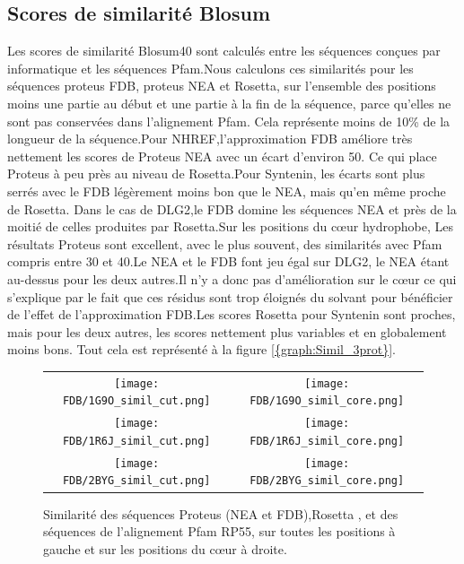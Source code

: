 \subsection{Scores de similarité Blosum}
Les scores de similarité Blosum40 sont calculés entre les séquences conçues par informatique et les séquences Pfam.Nous calculons ces similarités pour les séquences proteus FDB, proteus NEA et Rosetta, sur l'ensemble des positions moins une partie au début et une partie à la fin de la séquence, parce qu'elles ne sont pas conservées dans l'alignement Pfam.
Cela représente moins de 10\% de la longueur de la séquence.Pour NHREF,l'approximation FDB améliore très nettement les scores de Proteus NEA avec un écart d'environ 50. Ce qui place Proteus à peu près au niveau de Rosetta.Pour Syntenin, les écarts sont plus serrés avec le FDB légèrement moins bon que le NEA, mais qu'en même proche de Rosetta. Dans le cas de DLG2,le FDB domine les séquences NEA et près de la moitié de celles produites par Rosetta.Sur les positions du cœur hydrophobe, Les résultats Proteus sont excellent, avec le plus souvent, des similarités avec Pfam compris entre 30 et 40.Le NEA et le FDB font jeu égal sur DLG2, le NEA étant au-dessus pour les deux autres.Il n'y a donc pas d'amélioration sur le cœur ce qui s'explique par le fait que ces résidus sont trop éloignés du solvant pour bénéficier de l'effet de l'approximation FDB.Les scores Rosetta pour Syntenin sont proches, mais pour les deux autres, les scores nettement plus variables et en globalement moins bons. Tout cela est représenté à la figure  \ref{{graph:Simil_3prot}}.

   \begin{figure}[t]
     \centering
     \begin{tabular}{cc} 
       \texttt{[image: FDB/1G9O\_simil\_cut.png]} &
       \texttt{[image: FDB/1G9O\_simil\_core.png]} \\
       \texttt{[image: FDB/1R6J\_simil\_cut.png]} &
       \texttt{[image: FDB/1R6J\_simil\_core.png]} \\
       \texttt{[image: FDB/2BYG\_simil\_cut.png]} &
       \texttt{[image: FDB/2BYG\_simil\_core.png]} \\
     \end{tabular}
     \caption{Similarité des séquences Proteus (NEA et FDB),Rosetta , et des séquences de l'alignement Pfam RP55, sur toutes les positions à gauche  et sur les positions du cœur à droite.}

     \label{graph:Simil_3prot}
   \end{figure}

